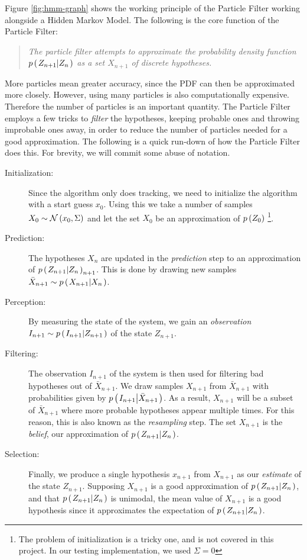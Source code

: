 Figure \ref{fig:hmm-graph} shows the working principle of the Particle Filter working alongside a Hidden Markov Model. The following is the core function of the Particle Filter:

\begin{quote}
  \emph{The particle filter attempts to approximate the probability density function $p\left(\left. Z_{n+1} \middle\vert Z_n \right.\right)$ as a set $X_{n+1}$ of discrete hypotheses.}
\end{quote}

More particles mean greater accuracy, since the PDF can then be approximated more closely. However, using many particles is also computationally expensive. Therefore the number of particles is an important quantity. The Particle Filter employs a few tricks to \emph{filter} the hypotheses, keeping probable ones and throwing improbable ones away, in order to reduce the number of particles needed for a good approximation. The following is a quick run-down of how the Particle Filter does this. For brevity, we will commit some abuse of notation.

\begin{description}
\item[Initialization:] Since the algorithm only does tracking, we need to initialize the algorithm with a start guess $x_0$. Using this we take a number of samples $X_0 \sim \mathcal{N}\left(x_0, \Sigma\right)$ and let the set $X_0$ be an approximation of $p\left(Z_0\right)$ \footnote{The problem of initialization is a tricky one\cite{Hedvig}, and is not covered in this project. In our testing implementation, we used $\Sigma = 0$}.
\item[Prediction:] The hypotheses $X_n$ are updated in the \emph{prediction} step to an approximation of $p\left(\left. Z_{n+1} \middle\vert Z_n \right.\right)_{n+1}$. This is done by drawing new samples $\bar{X}_{n+1} \sim p\left(\left. X_{n+1} \middle\vert X_n \right.\right)$.
\item[Perception:] By measuring the state of the system, we gain an \emph{observation} $I_{n+1} \sim p\left(\left. I_{n+1} \middle\vert Z_{n+1} \right.\right)$ of the state $Z_{n+1}$.
\item[Filtering:] The observation $I_{n+1}$ of the system is then used for filtering bad hypotheses out of $\bar{X}_{n+1}$. We draw samples $X_{n+1}$ from $\bar{X}_{n+1}$ with probabilities given by $p\left(\left. I_{n+1} \middle\vert \bar{X}_{n+1} \right.\right)$. As a result, $X_{n+1}$ will be a subset of $\bar{X}_{n+1}$ where more probable hypotheses appear multiple times. For this reason, this is also known as the \emph{resampling} step. The set $X_{n+1}$ is the \emph{belief}, our approximation of $p\left(\left. Z_{n+1} \middle\vert Z_n \right.\right)$.
\item[Selection:] Finally, we produce a single hypothesis $x_{n+1}$ from $X_{n+1}$ as our \emph{estimate} of the state $Z_{n+1}$. Supposing $X_{n+1}$ is a good approximation of $p\left(\left. Z_{n+1} \middle\vert Z_n \right.\right)$, and that $p\left(\left. Z_{n+1} \middle\vert Z_n \right.\right)$ is unimodal, the mean value of $X_{n+1}$ is a good hypothesis since it approximates the expectation of $p\left(\left. Z_{n+1} \middle\vert Z_n \right.\right)$.
\end{description}

